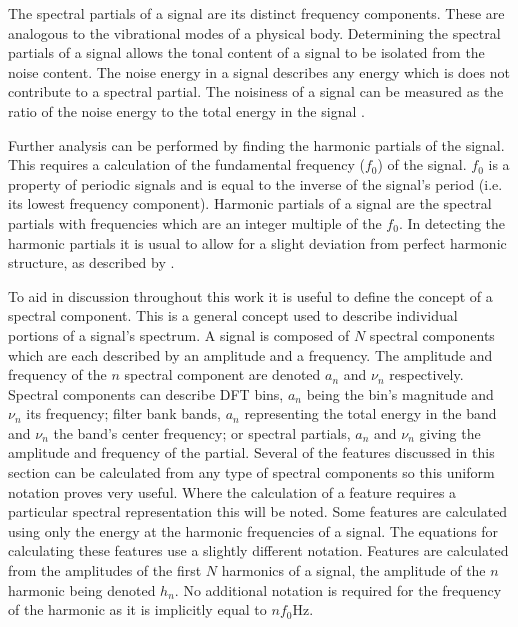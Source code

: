 		The spectral partials of a signal are its distinct frequency components. These are analogous to the
		vibrational modes of a physical body. Determining the spectral partials of a signal allows the tonal
		content of a signal to be isolated from the noise content. The noise energy in a signal describes any
		energy which is does not contribute to a spectral partial. The noisiness of a signal can be measured as the
		ratio of the noise energy to the total energy in the signal \citep{serra1998sound}.

		Further analysis can be performed by finding the harmonic partials of the signal. This requires a
		calculation of the fundamental frequency ($f_{0}$) of the signal. $f_{0}$ is a property of periodic signals
		and is equal to the inverse of the signal's period (i.e. its lowest frequency component). Harmonic partials
		of a signal are the spectral partials with frequencies which are an integer multiple of the $f_{0}$. In
		detecting the harmonic partials it is usual to allow for a slight deviation from perfect harmonic
		structure, as described by \citet{peeters2011the}.

		To aid in discussion throughout this work it is useful to define the concept of a spectral component. This
		is a general concept used to describe individual portions of a signal's spectrum. A signal is composed of
		$N$ spectral components which are each described by an amplitude and a frequency. The amplitude and
		frequency of the $n$ spectral component are denoted $a_{n}$ and $\nu_{n}$ respectively. Spectral
		components can describe DFT bins, $a_{n}$ being the bin's magnitude and $\nu_{n}$ its frequency; filter
		bank bands, $a_{n}$ representing the total energy in the band and $\nu_{n}$ the band's center frequency; or
		spectral partials, $a_{n}$ and $\nu_{n}$ giving the amplitude and frequency of the partial. Several of the
		features discussed in this section can be calculated from any type of spectral components so this uniform
		notation proves very useful. Where the calculation of a feature requires a particular spectral
		representation this will be noted. Some features are calculated using only the energy at the harmonic
		frequencies of a signal. The equations for calculating these features use a slightly different notation.
		Features are calculated from the amplitudes of the first $N$ harmonics of a signal, the amplitude of the
		$n$ harmonic being denoted $h_{n}$. No additional notation is required for the frequency of the
		harmonic as it is implicitly equal to $nf_{0}$Hz.

